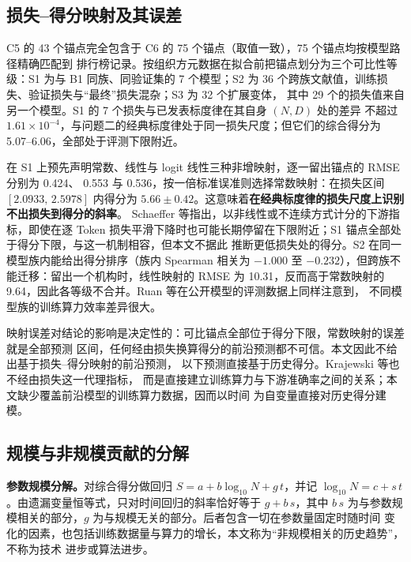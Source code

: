 \subsection{损失–得分映射及其误差}
\label{sec:q4-bridge}

C5 的 43 个锚点完全包含于 C6 的 75 个锚点（取值一致），75 个锚点均按模型路径精确匹配到
排行榜记录。按组织方元数据在拟合前把锚点划分为三个可比性等级：S1 为与 B1 同族、同验证集的
7 个模型；S2 为 36 个跨族文献值，训练损失、验证损失与“最终”损失混杂；S3 为 32 个扩展变体，
其中 29 个的损失值来自另一个模型。S1 的 7 个损失与已发表标度律在其自身 $(N,D)$ 处的差异
不超过 $1.61\times10^{-4}$，与问题二的经典标度律处于同一损失尺度；但它们的综合得分为
5.07--6.06，全部处于评测下限附近。

在 S1 上预先声明常数、线性与 logit 线性三种非增映射，逐一留出锚点的 RMSE 分别为 0.424、
0.553 与 0.536，按一倍标准误准则选择常数映射：在损失区间 $[2.0933,\,2.5978]$ 内得分为
$5.66\pm0.42$。这意味着\textbf{在经典标度律的损失尺度上识别不出损失到得分的斜率}。
Schaeffer 等\cite{schaeffer2023mirage}指出，以非线性或不连续方式计分的下游指标，即使在逐 Token
损失平滑下降时也可能长期停留在下限附近；S1 锚点全部处于得分下限，与这一机制相容，但本文不据此
推断更低损失处的得分。S2 在同一模型族内能给出得分排序（族内 Spearman 相关为 $-1.000$ 至
$-0.232$），但跨族不能迁移：留出一个机构时，线性映射的 RMSE 为 10.31，反而高于常数映射的
9.64，因此各等级不合并。Ruan 等\cite{ruan2024observational}在公开模型的评测数据上同样注意到，
不同模型族的训练算力效率差异很大。

映射误差对结论的影响是决定性的：可比锚点全部位于得分下限，常数映射的误差就是全部预测
区间，任何经由损失换算得分的前沿预测都不可信。本文因此不给出基于损失–得分映射的前沿预测，
以下预测直接基于历史得分。Krajewski 等\cite{krajewski2026downstream}也不经由损失这一代理指标，
而是直接建立训练算力与下游准确率之间的关系；本文缺少覆盖前沿模型的训练算力数据，因而以时间
为自变量直接对历史得分建模。

\subsection{规模与非规模贡献的分解}

\textbf{参数规模分解。}对综合得分做回归 $S=a+b\log_{10}N+g\,t$，并记
$\log_{10}N=c+s\,t$。由遗漏变量恒等式，只对时间回归的斜率恰好等于 $g+b\,s$，其中
$b\,s$ 为与参数规模相关的部分，$g$ 为与规模无关的部分。后者包含一切在参数量固定时随时间
变化的因素，也包括训练数据量与算力的增长，本文称为“非规模相关的历史趋势”，不称为技术
进步或算法进步。

